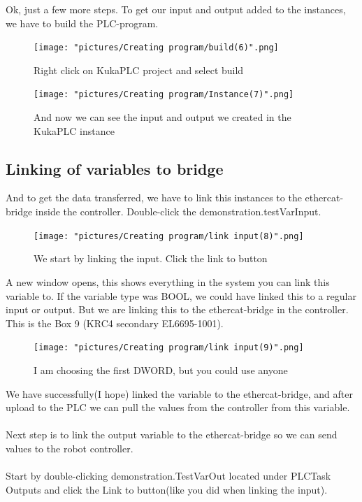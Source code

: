 \documentclass{article}
\begin{document}
\newpage

Ok, just a few more steps. To get our input and output added to the instances, we have to build the PLC-program. 

\begin{figure}[!h]
    \centering
    \texttt{[image: "pictures/Creating program/build(6)".png]}
    \caption{Right click on KukaPLC project and select build}
   
\end{figure}



\begin{figure}[!h]
    \centering
    \texttt{[image: "pictures/Creating program/Instance(7)".png]}
    \caption{And now we can see the input and output we created in the KukaPLC instance}
   
\end{figure}

\newpage

\subsection{Linking of variables to bridge}

And to get the data transferred, we have to link this instances to the ethercat-bridge inside the controller. Double-click the demonstration.testVarInput.


\begin{figure}[!h]
    \centering
    \texttt{[image: "pictures/Creating program/link input(8)".png]}
    \caption{We start by linking the input. Click the link to button}
   
\end{figure}

A new window opens, this shows everything in the system you can link this variable to. If the variable type was BOOL, we could have linked this to a regular input or output. But we are linking this to the ethercat-bridge in the controller. This is the Box 9 (KRC4 secondary EL6695-1001). 

\begin{figure}[!h]
    \centering
    \texttt{[image: "pictures/Creating program/link input(9)".png]}
    \caption{I am choosing the first DWORD, but you could use anyone }
   
\end{figure}

\newpage

We have successfully(I hope) linked the variable to the ethercat-bridge, and after upload to the PLC we can pull the values from the controller from this variable.
\\\\
Next step is to link the output variable to the ethercat-bridge so we can send values to the robot controller. 
\\\\
Start by double-clicking demonstration.TestVarOut located under PLCTask Outputs and click the Link to button(like you did when linking the input).
\\\\
\end{document}
